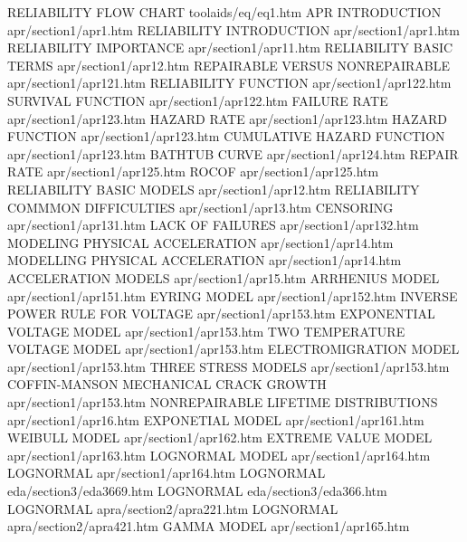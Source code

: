 RELIABILITY FLOW CHART                  toolaids/eq/eq1.htm
APR INTRODUCTION                        apr/section1/apr1.htm
RELIABILITY INTRODUCTION                apr/section1/apr1.htm
RELIABILITY IMPORTANCE                  apr/section1/apr11.htm
RELIABILITY BASIC TERMS                 apr/section1/apr12.htm
REPAIRABLE VERSUS NONREPAIRABLE         apr/section1/apr121.htm
RELIABILITY FUNCTION                    apr/section1/apr122.htm
SURVIVAL FUNCTION                       apr/section1/apr122.htm
FAILURE RATE                            apr/section1/apr123.htm
HAZARD RATE                             apr/section1/apr123.htm
HAZARD FUNCTION                         apr/section1/apr123.htm
CUMULATIVE HAZARD FUNCTION              apr/section1/apr123.htm
BATHTUB CURVE                           apr/section1/apr124.htm
REPAIR RATE                             apr/section1/apr125.htm
ROCOF                                   apr/section1/apr125.htm
RELIABILITY BASIC MODELS                apr/section1/apr12.htm
RELIABILITY COMMMON DIFFICULTIES        apr/section1/apr13.htm
CENSORING                               apr/section1/apr131.htm
LACK OF FAILURES                        apr/section1/apr132.htm
MODELING PHYSICAL ACCELERATION          apr/section1/apr14.htm
MODELLING PHYSICAL ACCELERATION         apr/section1/apr14.htm
ACCELERATION MODELS                     apr/section1/apr15.htm
ARRHENIUS MODEL                         apr/section1/apr151.htm
EYRING MODEL                            apr/section1/apr152.htm
INVERSE POWER RULE FOR VOLTAGE          apr/section1/apr153.htm
EXPONENTIAL VOLTAGE MODEL               apr/section1/apr153.htm
TWO TEMPERATURE VOLTAGE MODEL           apr/section1/apr153.htm
ELECTROMIGRATION MODEL                  apr/section1/apr153.htm
THREE STRESS MODELS                     apr/section1/apr153.htm
COFFIN-MANSON MECHANICAL CRACK GROWTH   apr/section1/apr153.htm
NONREPAIRABLE LIFETIME DISTRIBUTIONS    apr/section1/apr16.htm
EXPONETIAL MODEL                        apr/section1/apr161.htm
WEIBULL MODEL                           apr/section1/apr162.htm
EXTREME VALUE MODEL                     apr/section1/apr163.htm
LOGNORMAL MODEL                         apr/section1/apr164.htm
LOGNORMAL                               apr/section1/apr164.htm
LOGNORMAL                               eda/section3/eda3669.htm
LOGNORMAL                               eda/section3/eda366.htm
LOGNORMAL                               apra/section2/apra221.htm
LOGNORMAL                               apra/section2/apra421.htm
GAMMA MODEL                             apr/section1/apr165.htm
